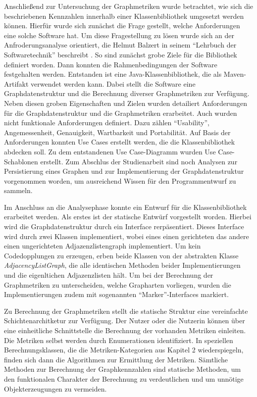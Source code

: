 \documentclass[a4paper,12pt,ngerman,chapterprefix=false,listof=totoc,bibliography=totoc]{scrreprt}
\begin{document}
{{{Anschließend zur Untersuchung der Graphmetriken wurde betrachtet, wie sich die beschriebenen Kennzahlen innerhalb einer Klassenbibliothek umgesetzt werden können. Hierfür wurde sich zunächst die Frage gestellt, welche Anforderungen eine solche Software hat. Um diese Fragestellung zu lösen wurde sich an der Anfroderungsanalyse orientiert, die Helmut Balzert in seinem "`Lehrbuch der Softwaretechnik"' beschreibt \cite{balzert_lehrbuch_2009}. So sind zunächst grobe Ziele für die Bibliothek definiert worden. Dann konnten die Rahmenbedingungen der Software festgehalten werden. Entstanden ist eine Java-Klassenbibliothek, die als Maven-Artifakt verwendet werden kann. Dabei stellt die Software eine Graphdatenstruktur und die Berechnung diverser Graphmetriken zur Verfügung. Neben diesen groben Eigenschaften und Zielen wurden detailiert Anforderungen für die Graphdatenstruktur und die Graphmetriken erarbeitet. Auch wurden nicht funktionale Anforderungen definiert. Dazu zählen "`Usability"', Angemessenheit, Genauigkeit, Wartbarkeit und Portabilität. Auf Basis der Anforderungen konnten Use Cases erstellt werden, die die Klassenbibliothek abdecken soll. Zu dem entstandenen Use Case-Diagramm wurden Use Case-Schablonen erstellt. Zum Abschlus der Studienarbeit sind noch Analysen zur Persistierung eines Graphen und zur Implementierung der Graphdatenstruktur vorgenommen worden, um ausreichend Wissen für den Programmentwurf zu sammeln.

Im Anschluss an die Analysephase konnte ein Entwurf für die Klassenbibliothek erarbeitet werden. Als erstes ist der statische Entwürf vorgestellt worden. Hierbei wird die Graphdatenstruktur durch ein Interface rerpäsentiert. Dieses Interface wird durch zwei Klassen implementiert, wobei eines einen gerichteten das andere einen ungerichteten Adjazenzlistengraph implementiert. Um kein Codedopplungen zu erzeugen, erben beide Klassen von der abstrakten Klasse \textit{AdjacencyListGraph}, die alle identischen Methoden beider Implementierungen und die eigenltichen Adjazenzlisten hält. Um bei der Berechnung der Graphmetriken zu unterscheiden, welche Grapharten vorliegen, wurden die Implementierungen zudem mit sogenannten "`Marker"'-Interfaces markiert.

Zu Berechnung der Graphmetriken stellt die statische Struktur eine vereinfachte Schichtenarchitketur zur Verfügung. Der Nutzer oder die Nutzerin können über eine einheitliche Schnittstelle die Berechnung der vorhanden Metriken einleiten. Die Metriken selbst werden durch Enumerationen identifiziert. In speziellen Berechnungsklassen, die die Metriken-Kategorien aus Kapitel 2 wiederspiegeln, finden sich dann die Algorithmen zur Ermittlung der Metriken. Sämtliche Methoden zur Berechnung der Graphkennzahlen sind statische Methoden, um den funktionalen Charakter der Berechnung zu verdeutlichen und um unnötige Objekterzeugungen zu vermeiden.

}}}
\end{document}
